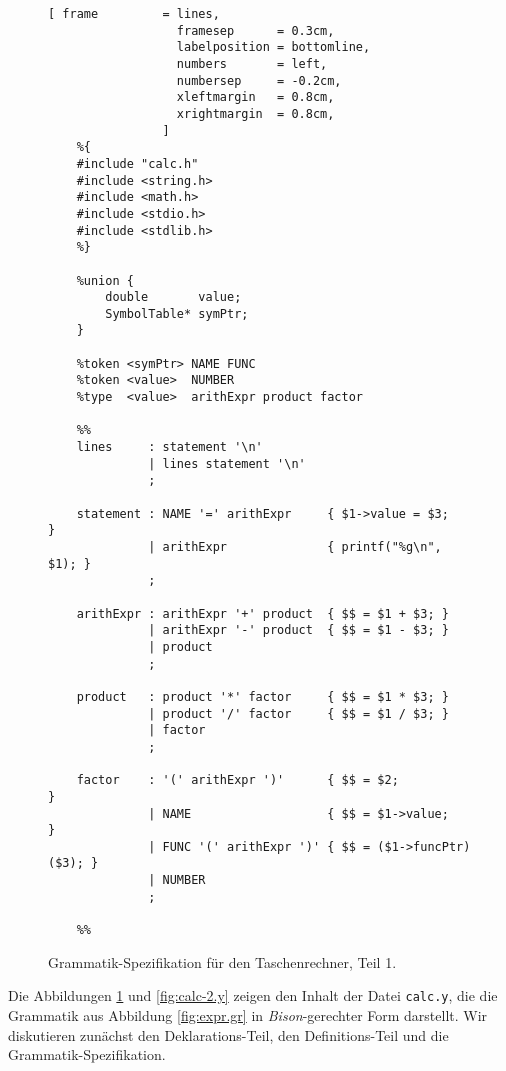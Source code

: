 \begin{figure}[!ht]
\centering
\begin{Verbatim}[ frame         = lines, 
                  framesep      = 0.3cm, 
                  labelposition = bottomline,
                  numbers       = left,
                  numbersep     = -0.2cm,
                  xleftmargin   = 0.8cm,
                  xrightmargin  = 0.8cm,
                ]
    %{
    #include "calc.h"
    #include <string.h>
    #include <math.h>
    #include <stdio.h>
    #include <stdlib.h>
    %}
    
    %union {
        double       value;
        SymbolTable* symPtr;
    }
    
    %token <symPtr> NAME FUNC
    %token <value>  NUMBER
    %type  <value>  arithExpr product factor
    
    %%
    lines     : statement '\n'
              | lines statement '\n'
              ;
    
    statement : NAME '=' arithExpr     { $1->value = $3;     }
              | arithExpr              { printf("%g\n", $1); }
              ;
    
    arithExpr : arithExpr '+' product  { $$ = $1 + $3; }
              | arithExpr '-' product  { $$ = $1 - $3; }
              | product
              ;
    
    product   : product '*' factor     { $$ = $1 * $3; }
              | product '/' factor     { $$ = $1 / $3; }
              | factor 
              ;
    
    factor    : '(' arithExpr ')'      { $$ = $2;                }
              | NAME                   { $$ = $1->value;         }
              | FUNC '(' arithExpr ')' { $$ = ($1->funcPtr)($3); }
              | NUMBER 
              ;
    
    %%
\end{Verbatim} 
\vspace*{-0.3cm}
\caption{Grammatik-Spezifikation f\"ur den Taschenrechner, Teil 1.}
\label{fig:calc.y}
\end{figure} %
Die Abbildungen \ref{fig:calc.y} und \ref{fig:calc-2.y} zeigen den Inhalt der Datei
\texttt{calc.y}, die die Grammatik aus Abbildung \ref{fig:expr.gr} in
\textsl{Bison}-gerechter Form darstellt.  Wir diskutieren zun\"achst den Deklarations-Teil,
den Definitions-Teil und die Grammatik-Spezifikation.
